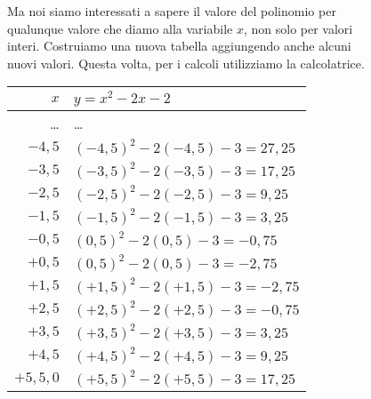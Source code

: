 \begin{figure}[h]
 \begin{minipage}[]{.58\textwidth}
Ma noi siamo interessati a sapere il valore del polinomio per qualunque 
valore che diamo alla variabile \(x\), non solo per valori interi. 
Costruiamo una nuova tabella aggiungendo anche alcuni nuovi valori. 
Questa volta, per i calcoli utilizziamo la calcolatrice.
  \begin{center}
   \begin{tabular}{r|l}
    \(x\)   & \(y=x^2-2x-2\) \\
    \hline
    \dots & \dots \\
    \(-4,5\) & \((-4,5)^2 -2(-4,5) -3 = 27,25\) \\
    \(-3,5\) & \((-3,5)^2 -2(-3,5) -3 = 17,25\) \\
    \(-2,5\) & \((-2,5)^2 -2(-2,5) -3 = 9,25\) \\
    \(-1,5\) & \((-1,5)^2 -2(-1,5) -3 = 3,25\) \\
    \(-0,5\) & \((0,5)^2 -2(0,5) -3 = -0,75\) \\
    \(+0,5\) & \((0,5)^2 -2(0,5) -3 = -2,75\) \\
    \(+1,5\) & \((+1,5)^2 -2(+1,5) -3 = -2,75\) \\
    \(+2,5\) & \((+2,5)^2 -2(+2,5) -3 = -0,75\) \\
    \(+3,5\) & \((+3,5)^2 -2(+3,5) -3 = 3,25\) \\
    \(+4,5\) & \((+4,5)^2 -2(+4,5) -3 = 9,25\) \\
    \(+5,5,0\) & \((+5,5)^2 -2(+5,5) -3 = 17,25\) \\

\end{tabular}
\end{center}
\end{minipage}
\end{figure}
